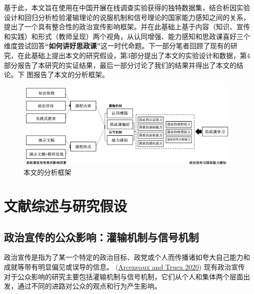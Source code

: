 \documentclass[
  12pt,
]{ctexart}
\begin{document}
基于此，本文旨在使用在中国开展在线调查实验获得的独特数据集，结合析因实验设计和回归分析检验灌输理论的说服机制和信号理论的国家能力感知之间的关系，提出了一个具有整合性的政治宣传影响框架。并在此基础上基于内容（知识、宣传和实践）和形式（教师呈现）两个视角，从认同增强、能力感知和思政课喜好三个维度尝试回答\textbf{``如何讲好思政课''}这一时代命题。下一部分笔者回顾了现有的研究，在此基础上提出本文的研究假设，第3部分提出了本文的实验设计和数据，第4部分报告了本研究的实证结果，最后一部分讨论了我们的结果并得出了本文的结论。下
图报告了本文的分析框架。

\begin{figure}[h]
\includegraphics[width=1\linewidth]{../figures/figure1} \caption{本文的分析框架}\label{fig:unnamed-chunk-1}
\end{figure}

\hypertarget{ux6587ux732eux7efcux8ff0ux4e0eux7814ux7a76ux5047ux8bbe}{%
\section{文献综述与研究假设}\label{ux6587ux732eux7efcux8ff0ux4e0eux7814ux7a76ux5047ux8bbe}}

\hypertarget{ux653fux6cbbux5ba3ux4f20ux7684ux516cux4f17ux5f71ux54cdux704cux8f93ux673aux5236ux4e0eux4fe1ux53f7ux673aux5236}{%
\subsection{政治宣传的公众影响：灌输机制与信号机制}\label{ux653fux6cbbux5ba3ux4f20ux7684ux516cux4f17ux5f71ux54cdux704cux8f93ux673aux5236ux4e0eux4fe1ux53f7ux673aux5236}}

政治宣传是指为了某一个特定的政治目标、政党或个人而传播诸如夸大自己能力和成就等带有明显偏见或误导的信息。
(\protect\hyperlink{ref-ArceneauxTruex2020}{Arceneaux and Truex 2020}) 现有政治宣传对于公众影响的研究主要包括灌输机制与信号机制，它们从个人和集体两个层面出发，通过不同的进路对公众的观点和行为产生影响。
\end{document}
